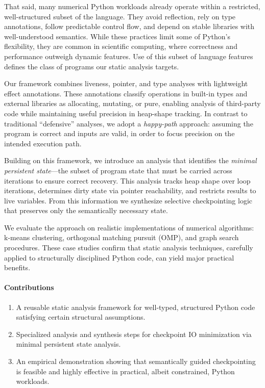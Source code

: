 That said, many numerical Python workloads already operate within a restricted, well-structured subset of the language. They avoid reflection, rely on type annotations, follow predictable control flow, and depend on stable libraries with well-understood semantics. While these practices limit some of Python’s flexibility, they are common in scientific computing, where correctness and performance outweigh dynamic features. Use of this subset of language features defines the class of programs our static analysis targets.

Our framework combines liveness, pointer, and type analyses with lightweight effect annotations. These annotations classify operations in built-in types and external libraries as allocating, mutating, or pure, enabling analysis of third-party code while maintaining useful precision in heap-shape tracking. In contrast to traditional ``defensive'' analyses, we adopt a \emph{happy-path} approach: assuming the program is correct and inputs are valid, in order to focus precision on the intended execution path.

Building on this framework, we introduce an analysis that identifies the \emph{minimal persistent state}—the subset of program state that must be carried across iterations to ensure correct recovery. This analysis tracks heap shape over loop iterations, determines dirty state via pointer reachability, and restricts results to live variables. From this information we synthesize selective checkpointing logic that preserves only the semantically necessary state.

We evaluate the approach on realistic implementations of numerical algorithms: k-means clustering, orthogonal matching pursuit (OMP), and graph search procedures. These case studies confirm that static analysis techniques, carefully applied to structurally disciplined Python code, can yield major practical benefits.


\paragraph{Contributions}
\begin{enumerate}
\item A reusable static analysis framework for well-typed, structured Python code satisfying certain structural assumptions.
\item Specialized analysis and synthesis steps for checkpoint IO minimization via minimal persistent state analysis.
\item An empirical demonstration showing that semantically guided checkpointing is feasible and highly effective in practical, albeit constrained, Python workloads.
\end{enumerate}


